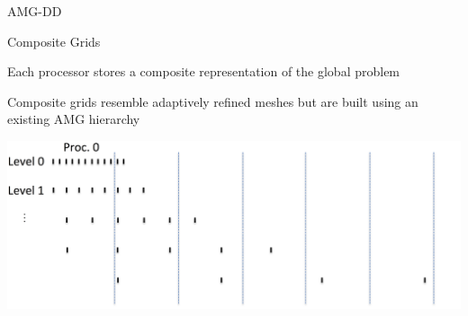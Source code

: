\documentclass[18pt,xcolor=table]{beamer}
\begin{document}
\begin{frame}{AMG-DD}
\begin{block}{Composite Grids}
\bit
\item Each processor stores a composite representation of the global problem
\item Composite grids resemble adaptively refined meshes but are built using an existing AMG hierarchy
\eit
\end{block}
\centering
\includegraphics[width=\textwidth]{../figures/compGridCreation1D13}
\end{frame}
\end{document}
